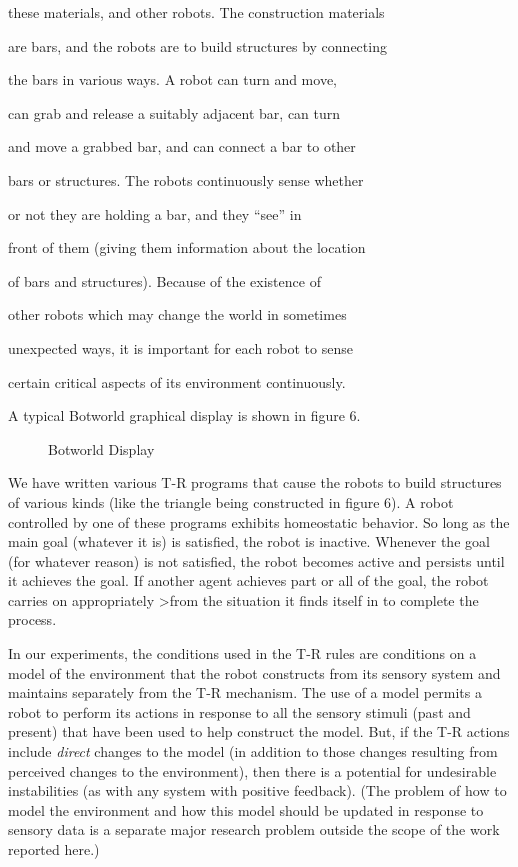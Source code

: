 these materials, and other robots.  The construction materials 

are bars, and the robots are to build structures by connecting 

the bars in various ways.  A robot can turn and move, 

can grab and release a suitably adjacent bar, can turn 

and move a grabbed bar, and can connect a bar to other 

bars or structures.  The robots continuously sense whether 

or not they are holding a bar, and they ``see''  in 

front of them (giving them information about the location 

of bars and structures).  Because of the existence of 

other robots which may change the world in sometimes 

unexpected ways, it is important for each robot to sense 

certain critical aspects of its environment continuously.

A typical Botworld graphical display is shown in figure 6.

\begin{figure}[htb]
\centerline{}
\caption{Botworld Display} 

\end{figure} 


 We have written various T-R programs that cause the robots to build  
structures of various kinds (like the triangle being constructed in figure  
6).  A robot controlled by one of these programs exhibits homeostatic  
behavior. So long as the main goal (whatever it is) is satisfied,  the robot  
is inactive.  Whenever the goal (for whatever reason) is not satisfied,  the  
robot becomes active and persists until it achieves the goal.  If another  
agent achieves part or all of the goal, the robot carries on appropriately  
>from the situation it finds itself in to complete the process.  

 

In our experiments, the conditions used in the T-R rules are conditions on a  
model of the environment that the robot constructs from its sensory system  
and maintains separately from the T-R mechanism.  The use of a model permits  
a robot  to perform its actions in response to all the sensory stimuli (past  
and present) that have been used to help construct the model.  But, if the  
T-R actions include {\it direct} changes to the model (in addition to those  
changes resulting from perceived changes to the environment), then there is a  
potential for undesirable instabilities (as with any system with positive  
feedback). (The problem of how to model the environment and how this model  
should be updated in response to sensory data is a separate major research  
problem outside the scope of the work reported here.)  


